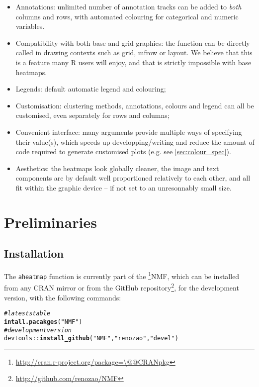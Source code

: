 \documentclass[a4paper]{article}\usepackage[]{graphicx}\usepackage[]{color}
\makeatletter
\newcommand{\hlstr}[1]{\textcolor[rgb]{0.192,0.494,0.8}{#1}}%
\newcommand{\hlcom}[1]{\textcolor[rgb]{0.678,0.584,0.686}{\textit{#1}}}%
\newcommand{\hlstd}[1]{\textcolor[rgb]{0.345,0.345,0.345}{#1}}%
\newcommand{\hlkwd}[1]{\textcolor[rgb]{0.737,0.353,0.396}{\textbf{#1}}}%
\newenvironment{kframe}{%
 \def\at@end@of@kframe{}%
 \ifinner\ifhmode%
  \def\at@end@of@kframe{\end{minipage}}%
  \begin{minipage}{\columnwidth}%
 \fi\fi%
 \def\FrameCommand##1{\hskip\@totalleftmargin \hskip-\fboxsep
 \colorbox{shadecolor}{##1}\hskip-\fboxsep
     \hskip-\linewidth \hskip-\@totalleftmargin \hskip\columnwidth}%
 \MakeFramed {\advance\hsize-\width
   \@totalleftmargin\z@ \linewidth\hsize
   \@setminipage}}%
 {\par\unskip\endMakeFramed%
 \at@end@of@kframe}
\newenvironment{knitrout}{}{} %
\let\code=\texttt
\newcommand{\pkgname}[1]{\textit{#1}\xspace}
\newcommand{\CRANurl}[1]{\url{http://cran.r-project.org/package=#1}}
\def\CRANpkg{\@ifstar\@CRANpkg\@@CRANpkg}
\def\@CRANpkg#1{\href{http://cran.r-project.org/package=#1}{\pkgname{#1}}\footnote{\CRANurl{#1}}}
\def\@@CRANpkg#1{\href{http://cran.r-project.org/package=#1}{\pkgname{#1}} package\footnote{\CRANurl{#1}}}
\newcommand{\footurl}[1]{\footnote{\url{#1}}}
\makeatother
\begin{document}
\begin{itemize}
\item Annotations: unlimited number of annotation tracks can be added to 
\emph{both} columns and rows, with automated colouring for categorical and 
numeric variables.
\item Compatibility with both base and grid graphics: the function can be 
directly called in drawing contexts such as grid, mfrow or layout.
We believe that this is a feature many R users will enjoy, and that is
strictly impossible with base heatmaps.
\item Legends: default automatic legend and colouring;
\item Customisation: clustering methods, annotations, colours and legend can all 
be customised, even separately for rows and columns;
\item Convenient interface: many arguments provide multiple ways of 
specifying their value(s), which speeds up developping/writing and reduce the 
amount of code required to generate customised plots (e.g. see
\cref{sec:colour_spec}).
\item Aesthetics: the heatmaps look globally cleaner, the image and text components 
are by default well proportioned relatively to each other, and all fit within 
the graphic device -- if not set to an unresonnably small size.
\end{itemize}

\section{Preliminaries}

\subsection{Installation}

The \code{aheatmap} function is currently part of the \CRANpkg{NMF}, which can
be installed from any CRAN mirror or from the GitHub
repository\footurl{http://github.com/renozao/NMF}, for the development version,
with the following commands:

\begin{knitrout}\small
{}\color{fgcolor}\begin{kframe}
\begin{alltt}
\hlcom{# latest stable}
\hlkwd{intall.pacakges}\hlstd{(}\hlstr{"NMF"}\hlstd{)}
\hlcom{# development version}
\hlstd{devtools::}\hlkwd{install_github}\hlstd{(}\hlstr{"NMF"}\hlstd{,} \hlstr{"renozao"}\hlstd{,} \hlstr{"devel"}\hlstd{)}
\end{alltt}
\end{kframe}
\end{knitrout}
\end{document}
